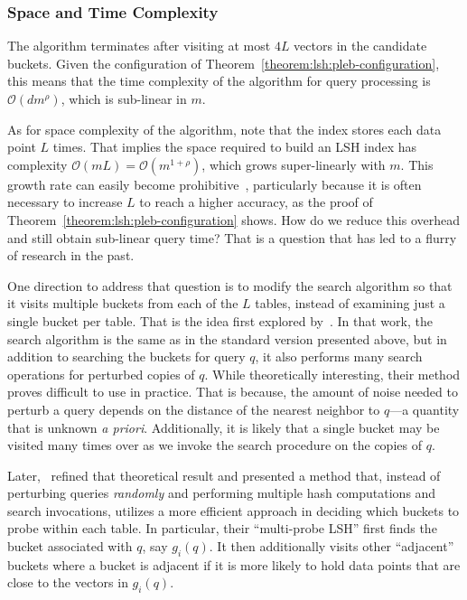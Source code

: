 \subsubsection{Space and Time Complexity}

The algorithm terminates after visiting at most $4L$ vectors in the candidate buckets.
Given the configuration of Theorem~\ref{theorem:lsh:pleb-configuration}, this means that
the time complexity of the algorithm for query processing is $\mathcal{O}(d m^\rho)$,
which is sub-linear in $m$.

As for space complexity of the algorithm, note that the index stores each
data point $L$ times. That implies the space required to build an LSH index
has complexity $\mathcal{O}(mL) = \mathcal{O}(m^{1 + \rho})$,
which grows super-linearly with $m$. This growth rate can easily become
prohibitive~\citep{gionis1999hashing,buhler2001lsh-comparison},
particularly because it is often necessary to increase $L$ to reach a higher
accuracy, as the proof of Theorem~\ref{theorem:lsh:pleb-configuration} shows.
How do we reduce this overhead and still obtain sub-linear query time?
That is a question that has led to a flurry of research in the past.

One direction to address that question is to modify the search algorithm so that it visits multiple
buckets from each of the $L$ tables, instead of examining just a single bucket per table.
That is the idea first explored by~\cite{entropyLSH}. In that work, the search
algorithm is the same as in the standard version presented above, but in addition to searching the
buckets for query $q$, it also performs many search operations for perturbed copies of $q$.
While theoretically interesting, their method proves difficult to use in practice.
That is because, the amount of noise needed to perturb a query depends on the distance
of the nearest neighbor to $q$---a quantity that is unknown \emph{a priori}.
Additionally, it is likely that a single bucket may be visited many times over
as we invoke the search procedure on the copies of $q$.

Later,~\cite{multiprobeLSH} refined that theoretical result and presented a method
that, instead of perturbing queries \emph{randomly} and performing multiple hash computations
and search invocations, utilizes a more efficient approach
in deciding which buckets to probe within each table. In particular,
their ``multi-probe LSH'' first finds the bucket associated with $q$, say $g_i(q)$.
It then additionally visits other ``adjacent'' buckets where a bucket is adjacent
if it is more likely to hold data points that are close to the vectors in $g_i(q)$.

